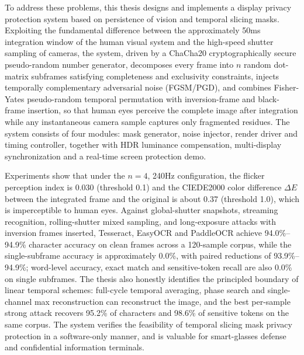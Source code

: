 To address these problems, this thesis designs and implements a display privacy protection system based on persistence of vision and temporal slicing masks. Exploiting the fundamental difference between the approximately 50ms integration window of the human visual system and the high-speed shutter sampling of cameras, the system, driven by a ChaCha20 cryptographically secure pseudo-random number generator, decomposes every frame into $n$ random dot-matrix subframes satisfying completeness and exclusivity constraints, injects temporally complementary adversarial noise (FGSM/PGD), and combines Fisher-Yates pseudo-random temporal permutation with inversion-frame and black-frame insertion, so that human eyes perceive the complete image after integration while any instantaneous camera sample captures only fragmented residues. The system consists of four modules: mask generator, noise injector, render driver and timing controller, together with HDR luminance compensation, multi-display synchronization and a real-time screen protection demo.

Experiments show that under the $n=4$, 240Hz configuration, the flicker perception index is 0.030 (threshold 0.1) and the CIEDE2000 color difference $\Delta E$ between the integrated frame and the original is about 0.37 (threshold 1.0), which is imperceptible to human eyes. Against global-shutter snapshots, streaming recognition, rolling-shutter mixed sampling, and long-exposure attacks with inversion frames inserted, Tesseract, EasyOCR and PaddleOCR achieve 94.0\%--94.9\% character accuracy on clean frames across a 120-sample corpus, while the single-subframe accuracy is approximately 0.0\%, with paired reductions of 93.9\%--94.9\%; word-level accuracy, exact match and sensitive-token recall are also 0.0\% on single subframes. The thesis also honestly identifies the principled boundary of linear temporal schemes: full-cycle temporal averaging, phase search and single-channel max reconstruction can reconstruct the image, and the best per-sample strong attack recovers 95.2\% of characters and 98.6\% of sensitive tokens on the same corpus. The system verifies the feasibility of temporal slicing mask privacy protection in a software-only manner, and is valuable for smart-glasses defense and confidential information terminals.

\vspace{6mm}
